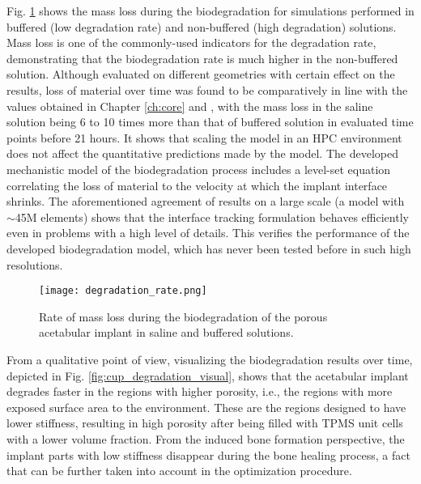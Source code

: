 Fig. \ref{fig:cup_degradation_rate} shows the mass loss during the biodegradation for simulations performed in buffered (low degradation rate) and non-buffered (high degradation) solutions. Mass loss is one of the commonly-used indicators for the degradation rate, demonstrating that the biodegradation rate is much higher in the non-buffered solution. Although evaluated on different geometries with certain effect on the results, loss of material over time was found to be comparatively in line with the values obtained in Chapter \ref{ch:core} and \cite{Barzegari2021}, with the mass loss in the saline solution being 6 to 10 times more than that of buffered solution in evaluated time points before 21 hours.  It shows that scaling the model in an {HPC} environment does not affect the quantitative predictions made by the model. The developed mechanistic model of the biodegradation process includes a level-set equation correlating the loss of material to the velocity at which the implant interface shrinks. The aforementioned agreement of results on a large scale (a model with $\sim$45M elements) shows that the interface tracking formulation behaves efficiently even in problems with a high level of details. This verifies the performance of the developed biodegradation model, which has never been tested before in such high resolutions.

\begin{figure}[h]
\centering
\medskip
\texttt{[image: degradation\_rate.png]}
\caption[Biodegradation rate for the acetabular implant]{Rate of mass loss during the biodegradation of the porous acetabular implant in saline and buffered solutions.} \label{fig:cup_degradation_rate}
\end{figure}

From a qualitative point of view, visualizing the biodegradation results over time, depicted in Fig. \ref{fig:cup_degradation_visual}, shows that the acetabular implant degrades faster in the regions with higher porosity, i.e., the regions with more exposed surface area to the environment. These are the regions designed to have lower stiffness, resulting in high porosity after being filled with {TPMS} unit cells with a lower volume fraction. From the induced bone formation perspective, the implant parts with low stiffness disappear during the bone healing process, a fact that can be further taken into account in the optimization procedure.

